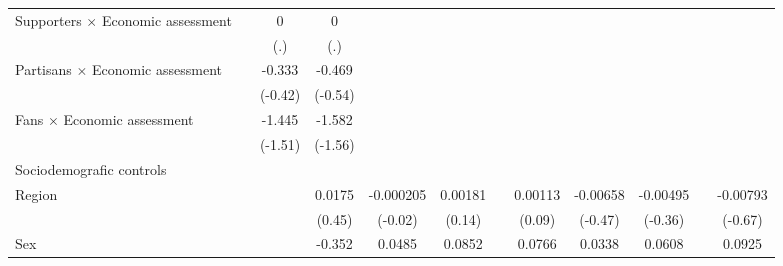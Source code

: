 {\begin{tabular}{l*{11}{c}}
Supporters $\times$ Economic assessment&                  &        0         &        0         &                  &                  &                  &                  &                  &                  &                  &                  \\
                &                  &      (.)         &      (.)         &                  &                  &                  &                  &                  &                  &                  &                  \\
Partisans $\times$ Economic assessment&                  &   -0.333         &   -0.469         &                  &                  &                  &                  &                  &                  &                  &                  \\
                &                  &  (-0.42)         &  (-0.54)         &                  &                  &                  &                  &                  &                  &                  &                  \\
Fans $\times$ Economic assessment&                  &   -1.445         &   -1.582         &                  &                  &                  &                  &                  &                  &                  &                  \\
                &                  &  (-1.51)         &  (-1.56)         &                  &                  &                  &                  &                  &                  &                  &                  \\
Sociodemografic controls&                  &                  &                  &                  &                  &                  &                  &                  &                  &                  &                  \\
Region          &                  &                  &   0.0175         &-0.000205         &  0.00181         &                  &  0.00113         & -0.00658         & -0.00495         &                  & -0.00793         \\
                &                  &                  &   (0.45)         &  (-0.02)         &   (0.14)         &                  &   (0.09)         &  (-0.47)         &  (-0.36)         &                  &  (-0.67)         \\
Sex             &                  &                  &   -0.352         &   0.0485         &   0.0852         &                  &   0.0766         &   0.0338         &   0.0608         &                  &   0.0925         \\

\end{tabular}}
